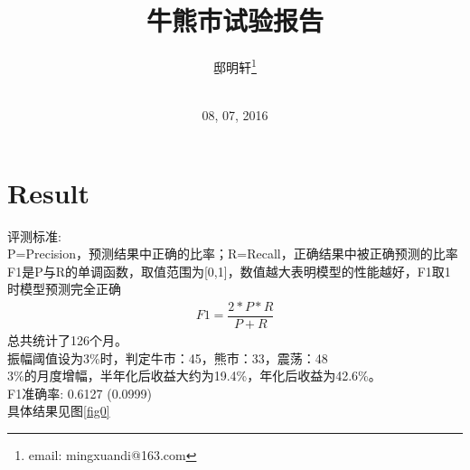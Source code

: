 \documentclass[10pt,a4paper]{article}
\author{邸明轩\footnote{email: mingxuandi@163.com}\\[2ex]
\\[2ex]}
\title{牛熊市试验报告 \uppercase\expandafter{\romannumeral1}}
\date{08, 07, 2016}
\begin{document}
\makeatletter
\let\@afterindentfalse\@afterindenttrue
\@afterindenttrue
\makeatother
\setlength{\parindent}{2em}  %

\maketitle

\section{Result }
评测标准:\\
P=Precision，预测结果中正确的比率；R=Recall，正确结果中被正确预测的比率 \\
F1是P与R的单调函数，取值范围为[0,1]，数值越大表明模型的性能越好，F1取1时模型预测完全正确
\begin{equation}
		\label{eq:u0}
\begin{aligned}
F1=\dfrac{2*P*R}{P+R} 
\end{aligned}
\end{equation}
总共统计了126个月。\\
振幅阈值设为3\%时，判定牛市：45，熊市：33，震荡：48\\
3\%的月度增幅，半年化后收益大约为19.4\%，年化后收益为42.6\%。\\
F1准确率: 0.6127 (0.0999)\\
具体结果见图\ref{fig0}
\end{document}

